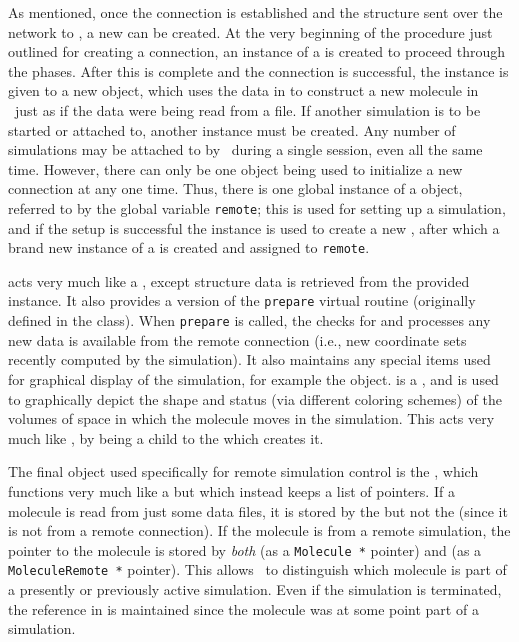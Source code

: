 As mentioned, once the connection is established and the structure sent over the network to \VMD, a new  can be created.  At the very beginning of the procedure just outlined for creating a connection, an instance of a  is created to proceed through the phases.  After this is complete and the connection is successful, the  instance is given to a new  object, which uses the data in  to construct a new molecule in \VMD\ just as if the data were being read from a file.  If another simulation is to be started or attached to, another  instance must be created.  Any number of simulations may be attached to by \VMD\ during a single session, even all the same time.  However, there can only be one  object being used to initialize a new connection at any one time.  Thus, there is one global instance of a  object, referred to by the global variable {\tt remote}; this is used for setting up a simulation, and if the setup is successful the instance is used to create a new , after which a brand new instance of a  is created and assigned to {\tt remote}.

 acts very much like a , except structure data is retrieved from the provided  instance.  It also provides a version of the {\tt prepare} virtual routine (originally defined in the  class).  When {\tt prepare} is called, the  checks for and processes any new data is available from the remote connection (i.e., new coordinate sets recently computed by the simulation).  It also maintains any special items used for graphical display of the simulation, for example the  object.   is a , and is used to graphically depict the shape and status (via different coloring schemes) of the volumes of space in which the molecule moves in the simulation.  This acts very much like , by being a child  to the  which creates it.

The final object used specifically for remote simulation control is the , which functions very much like a  but which instead keeps a list of  pointers.  If a molecule is read from just some data files, it is stored by the  but not the  (since it is not from a remote connection).  If the molecule is from a remote simulation, the pointer to the molecule is stored by {\em both}  (as a {\tt Molecule *} pointer) and  (as a {\tt MoleculeRemote *} pointer).  This allows \VMD\ to distinguish which molecule is part of a presently or previously active simulation.  Even if the simulation is terminated, the reference in  is maintained since the molecule was at some point part of a simulation.

